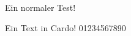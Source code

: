 \documentclass{article}
\begin{document}
\Huge

Ein normaler Test!

{\gfcardo Ein Text in Cardo! 01234567890}
\end{document}
